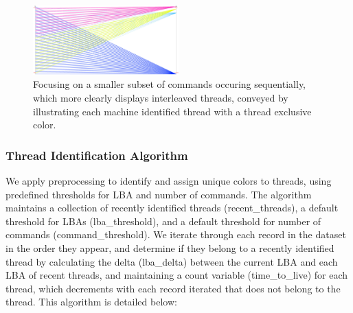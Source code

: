\documentclass[journal]{vgtc}                %
\begin{document}
\begin{figure}[h!]
 \centering
 \includegraphics[width=0.5\textwidth]{images/interleaved_color4.eps}
 \caption[A subset of data rendered with a thread exclusive colors.]{Focusing on a smaller subset of commands occuring sequentially, which more clearly displays interleaved threads, conveyed by illustrating each machine identified thread with a thread exclusive color.}
 \label{fig:color_focus2}
\end{figure}

\subsubsection{Thread Identification Algorithm}
We apply preprocessing to identify and assign unique colors to threads, using predefined thresholds for LBA and number of commands. The algorithm maintains a collection of recently identified threads (recent\_threads), a default threshold for LBAs (lba\_threshold), and a default threshold for number of commands (command\_threshold). We iterate through each record in the dataset in the order they appear, and determine if they belong to a recently identified thread by calculating the delta (lba\_delta) between the current LBA and each LBA of recent threads, and maintaining a count variable (time\_to\_live) for each thread, which decrements with each record iterated that does not belong to the thread. This algorithm is detailed below:
\end{document}
